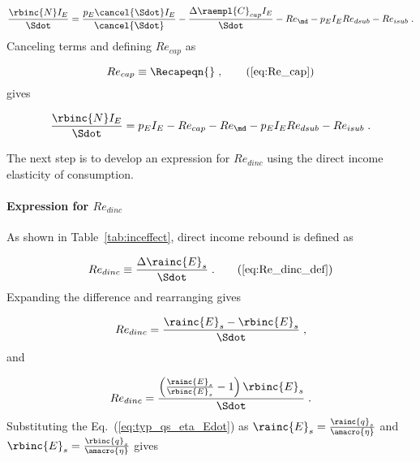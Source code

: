 \begin{equation}
  \frac{\rbinc{N} I_E}{\Sdot} = \frac{p_E \cancel{\Sdot} I_E}{\cancel{\Sdot}}
                                - \frac{\Delta \raempl{C}_{cap} I_E}{\Sdot}
                                - Re_{\md}
                                - p_E I_E Re_{dsub}
                                - Re_{isub} \; .
\end{equation}
%
Canceling terms and defining $Re_{cap}$ as

\begin{equation}
  Re_{cap} \equiv \Recapeqn{} \; , \tag{\ref{eq:Re_cap}}
\end{equation}
%
gives

\begin{equation} \label{eq:N_dot_I_E_Sdot}
  \frac{\rbinc{N} I_E}{\Sdot} = p_E I_E
                                - Re_{cap}
                                - Re_{\md}
                                - p_E I_E Re_{dsub}
                                - Re_{isub} \; .
\end{equation}

The next step is to develop an expression for $Re_{dinc}$
using the direct income elasticity of consumption.


\paragraph{Expression for $Re_{dinc}$}
\label{sec:Re_dinc}

As shown in Table~\ref{tab:inceffect}, direct income rebound is defined as

\begin{equation}
  Re_{dinc} \equiv \frac{\Delta \rainc{E}_s}{\Sdot} \; . \tag{\ref{eq:Re_dinc_def}}
\end{equation}
%
Expanding the difference and rearranging gives

\begin{equation}
  Re_{dinc} = \frac{\rainc{E}_s - \rbinc{E}_s}{\Sdot} \; , 
\end{equation}
%
and

\begin{equation}
  Re_{dinc} = \frac{\left( \frac{\rainc{E}_s}{\rbinc{E}_s} - 1  \right) \rbinc{E}_s}{\Sdot} \; .
\end{equation}
%
Substituting the Eq.~(\ref{eq:typ_qs_eta_Edot}) as
$\rainc{E}_s = \frac{\rainc{q}_s}{\amacro{\eta}}$ and  
$\rbinc{E}_s = \frac{\rbinc{q}_s}{\amacro{\eta}}$ gives

